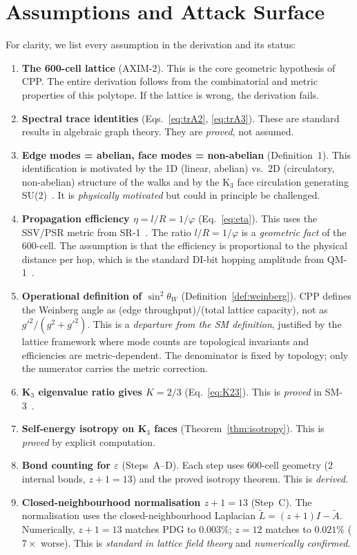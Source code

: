 \documentclass[11pt,letterpaper]{article}
\newcommand{\phig}{\varphi}
\begin{document}
\section{Assumptions and Attack Surface}
\label{sec:attack}
For clarity, we list every assumption in the derivation and its status:
\begin{enumerate}
\item \textbf{The 600-cell lattice} (AXIM-2). This is the core geometric hypothesis of CPP. The entire derivation follows from the combinatorial and metric properties of this polytope. If the lattice is wrong, the derivation fails.
\item \textbf{Spectral trace identities} (Eqs.~\ref{eq:trA2}, \ref{eq:trA3}). These are standard results in algebraic graph theory. They are \emph{proved}, not assumed.
\item \textbf{Edge modes = abelian, face modes = non-abelian} (Definition~1). This identification is motivated by the 1D (linear, abelian) vs.\ 2D (circulatory, non-abelian) structure of the walks and by the K$_3$ face circulation generating SU(2)~\citep{abshier2026ew1}. It is \emph{physically motivated} but could in principle be challenged.
\item \textbf{Propagation efficiency $\eta = l/R = 1/\phig$} (Eq.~\ref{eq:eta}). This uses the SSV/PSR metric from SR-1~\citep{abshier2026sr1}. The ratio $l/R = 1/\phig$ is a \emph{geometric fact} of the 600-cell. The assumption is that the efficiency is proportional to the physical distance per hop, which is the standard DI-bit hopping amplitude from QM-1~\citep{abshier2026qm1}.
\item \textbf{Operational definition of $\sin^2\theta_W$} (Definition~\ref{def:weinberg}). CPP defines the Weinberg angle as (edge throughput)/(total lattice capacity), not as $g'^2/(g^2+g'^2)$. This is a \emph{departure from the SM definition}, justified by the lattice framework where mode counts are topological invariants and efficiencies are metric-dependent. The denominator is fixed by topology; only the numerator carries the metric correction.
\item \textbf{K$_3$ eigenvalue ratio gives $K = 2/3$} (Eq.~\ref{eq:K23}). This is \emph{proved} in SM-3~\citep{abshier2026sm3}.
\item \textbf{Self-energy isotropy on K$_3$ faces} (Theorem~\ref{thm:isotropy}). This is \emph{proved} by explicit computation.
\item \textbf{Bond counting for $\varepsilon$} (Steps~A--D). Each step uses 600-cell geometry (2 internal bonds, $z+1 = 13$) and the proved isotropy theorem. This is \emph{derived}.
\item \textbf{Closed-neighbourhood normalisation $z+1 = 13$} (Step~C). The normalisation uses the closed-neighbourhood Laplacian $\tilde{L} = (z{+}1)I - \tilde{A}$. Numerically, $z+1 = 13$ matches PDG to $0.003\%$; $z = 12$ matches to $0.021\%$ ($7\times$ worse). This is \emph{standard in lattice field theory} and \emph{numerically confirmed}.
\end{enumerate}
\end{document}
